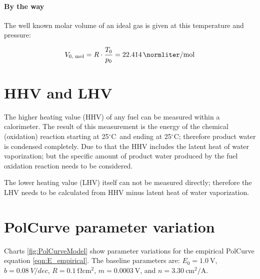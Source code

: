 \documentclass[11pt,a4paper,english,twoside]{scrreprt}
\newcommand{\gradC}{${}^\circ$C}      %
\begin{document}
\paragraph{By the way}

The well known molar volume of an ideal gas is given at this temperature and pressure:

\[
	V_\text{0, mol} = R \cdot \frac{T_0 }{p_0 } =\SI{22.414}{\normliter\per\mole}
\]



\section{HHV and LHV}

The higher heating value (HHV) of any fuel can be measured within a calorimeter. The result of this measurement is the energy of the chemical (oxidation) reaction starting at 25\gradC\ and ending at 25\gradC; therefore product water is condensed completely. Due to that the HHV includes the latent heat of water vaporization; but the specific amount of product water produced by the fuel oxidation reaction needs to be considered.

The lower heating value (LHV) itself can not be measured directly; therefore the LHV needs to be calculated from HHV minus latent heat of water vaporization.


\section{PolCurve parameter variation}

Charts \ref{fig:PolCurveModel} show parameter variations for the empirical PolCurve equation \ref{eqn:E_empirical}. The baseline parameters are: $E_0 = \SI{1.0}{\V}$, $b = \SI{0.08}{V/dec}$, $R = \SI{0.1}{\ohm\centi\meter\squared}$, $m = \SI{0.0003}{\V}$, and $n = \SI{3.30}{\centi\meter\squared\per\ampere}$.
\end{document}
